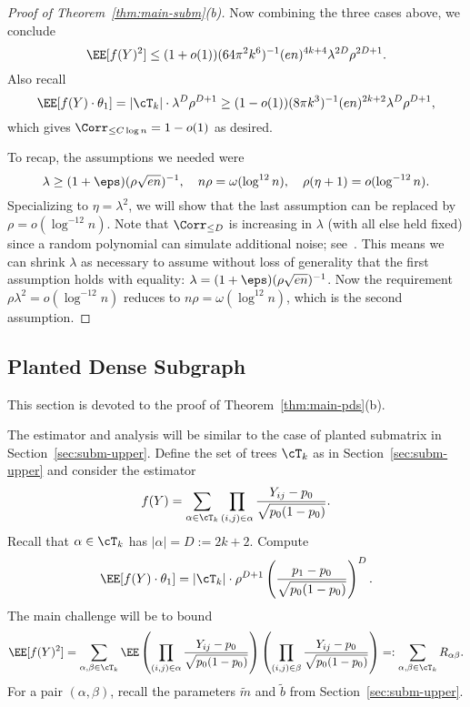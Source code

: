 \documentclass[11pt]{article}
\begin{document}
\begin{proof}[Proof of Theorem~\ref{thm:main-subm}(b)]
Now combining the three cases above, we conclude
\[ \EE[f(Y)^2] \le (1+o(1)) (64 \pi^2 k^6)^{-1} (en)^{4k+4} \lambda^{2D} \rho^{2D+1}. \]
Also recall
\[ \EE[f(Y) \cdot \theta_1] = |\cT_k| \cdot \lambda^D \rho^{D+1} \ge (1-o(1)) (8\pi k^3)^{-1} (en)^{2k+2} \lambda^D \rho^{D+1}, \]
which gives $\Corr_{\le C \log n} = 1-o(1)$ as desired.

To recap, the assumptions we needed were
\begin{equation}\label{eq:subm-upper-final-cond}
\lambda \ge (1+\eps)(\rho\sqrt{en})^{-1}, \quad n \rho = \omega(\log^{12} n), \quad \rho(\eta+1) = o(\log^{-12} n). 
\end{equation}
Specializing to $\eta = \lambda^2$, we will show that the last assumption can be replaced by $\rho = o(\log^{-12} n)$. Note that $\Corr_{\le D}$ is increasing in $\lambda$ (with all else held fixed) since a random polynomial can simulate additional noise; see~\cite[Claim~A.2 \& Fact~1.1]{SW-estimation}. This means we can shrink $\lambda$ as necessary to assume without loss of generality that the first assumption holds with equality: $\lambda = (1+\eps)(\rho\sqrt{en})^{-1}$. Now the requirement $\rho\lambda^2 = o(\log^{-12} n)$ reduces to $n \rho = \omega(\log^{12} n)$, which is the second assumption.
\end{proof}



\subsection{Planted Dense Subgraph}

This section is devoted to the proof of Theorem~\ref{thm:main-pds}(b).

The estimator and analysis will be similar to the case of planted submatrix in Section~\ref{sec:subm-upper}. Define the set of trees $\cT_k$ as in Section~\ref{sec:subm-upper} and consider the estimator
\[ f(Y) = \sum_{\alpha \in \cT_k} \prod_{(i,j) \in \alpha} \frac{Y_{ij}-p_0}{\sqrt{p_0(1-p_0)}}. \]
Recall that $\alpha \in \cT_k$ has $|\alpha| = D := 2k+2$. Compute
\[ \EE[f(Y) \cdot \theta_1] = |\cT_k| \cdot \rho^{D+1} \left(\frac{p_1-p_0}{\sqrt{p_0(1-p_0)}}\right)^D. \]
The main challenge will be to bound
\[ \EE[f(Y)^2] = \sum_{\alpha,\beta \in \cT_k} \EE \left(\prod_{(i,j) \in \alpha} \frac{Y_{ij}-p_0}{\sqrt{p_0(1-p_0)}}\right) \left(\prod_{(i,j) \in \beta} \frac{Y_{ij}-p_0}{\sqrt{p_0(1-p_0)}}\right) =: \sum_{\alpha,\beta \in \cT_k} R_{\alpha \beta}. \]
For a pair $(\alpha,\beta)$, recall the parameters $\tilde{m}$ and $\tilde{b}$ from Section~\ref{sec:subm-upper}.
\end{document}
